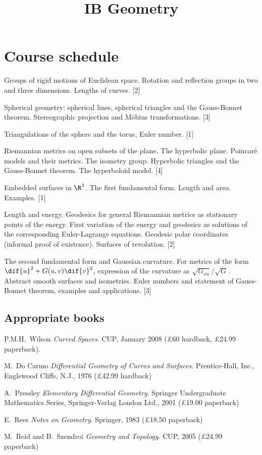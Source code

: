 \documentclass[twoside, numbers=noendperiod]{scrartcl}
\title{IB Geometry}
\begin{document}
{
\section*{Course schedule}

Groups of rigid motions of Euclidean space. Rotation and reflection groups in two and three dimensions. Lengths of curves. \hfill [2]

Spherical geometry: spherical lines, spherical triangles and the Gauss-Bonnet theorem. Stereographic projection and Möbius transformations. \hfill [3]

Triangulations of the sphere and the torus, Euler number. \hfill [1]

Riemannian metrics on open subsets of the plane. The hyperbolic plane. Poincar\'{e} models and their metrics. The isometry group. Hyperbolic triangles and the Gauss-Bonnet theorem. The hyperboloid model. \hfill [4]

Embedded surfaces in $\R^3$. The first fundamental form. Length and area. Examples. \hfill [1]

Length and energy. Geodesics for general Riemannian metrics as stationary points of the energy. First variation of the energy and geodesics as solutions of the corresponding Euler-Lagrange equations. Geodesic polar coordinates (informal proof of existence). Surfaces of revolution. \hfill [2]

The second fundamental form and Gaussian curvature. For metrics of the form $\dif{u}^2 + G(u,v) \dif{v}^2$, expression of the curvature as $\sqrt{G_{uu}}/\sqrt{G}$\,. Abstract smooth surfaces and isometries. Euler numbers and statement of Gauss-Bonnet theorem, examples and applications. \hfill [3]

\subsection*{Appropriate books}

{\shortskip
P.M.H.~Wilson \emph{Curved Spaces}. CUP, January 2008 (£60 hardback, £24.99 paperback).

M.~Do Carmo \emph{Differential Geometry of Curves and Surfaces}. Prentice-Hall, Inc., Englewood Cliffs, N.J., 1976 (£42.99 hardback)

A.~Pressley \emph{Elementary Differential Geometry}. Springer Undergraduate Mathematics Series, Springer-Verlag London Ltd., 2001 (£19.00 paperback)

E.~Rees \emph{Notes on Geometry}. Springer, 1983 (£18.50 paperback)

M.~Reid and B.~Szendroi \emph{Geometry and Topology}. CUP, 2005 (£24.99 paperback)}}

\TableofContents



\lecturenotesendshort
\end{document}
